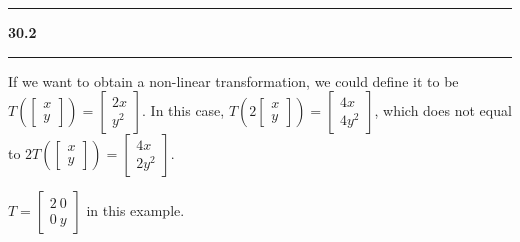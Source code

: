 \documentclass[11pt]{article}
\newcommand\question[2]{\vspace{.25in}\hrule\textbf{#1 #2}\vspace{.5em}\hrule\vspace{.10in}}
\begin{document}
\question{30.2}{}
If we want to obtain a non-linear transformation, we could define it to be  \(T(\begin{bmatrix} x \\ y \end{bmatrix}) = \begin{bmatrix} 2x \\ y^2 \end{bmatrix}\). In this case, \(T(2\begin{bmatrix} x \\ y \end{bmatrix}) = \begin{bmatrix} 4x \\ 4y^2\end{bmatrix}\), which does not equal to \(2T(\begin{bmatrix}x \\ y \end{bmatrix}) = \begin{bmatrix} 4x \\ 2y^2\end{bmatrix}\). 

\(T = \begin{bmatrix} 2 \ 0 \\ 0 \ y \end{bmatrix}\) in this example.
\end{document}
